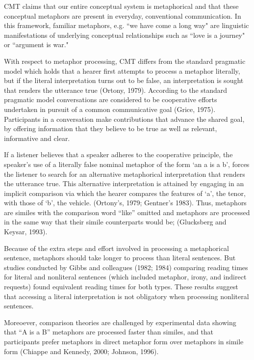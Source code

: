 \documentclass[]{article}
\begin{document}
	CMT claims that our entire conceptual system is metaphorical and that these conceptual metaphors are present in everyday, conventional communication. In this framework, familiar metaphors, e.g. ``we have come a long way" are linguistic manifestations of underlying conceptual relationships such as ``love is a journey" or ``argument is war." 
	
	With respect to metaphor processing, CMT differs from the standard pragmatic model  which holds that a hearer first attempts to process a metaphor literally, but if the literal interpretation turns out to be false, an interpretation is sought that renders the utterance true (Ortony, 1979). According to the standard pragmatic model conversations are considered to be cooperative efforts undertaken in pursuit of  a common communicative goal (Grice, 1975).  Participants in a conversation make contributions that advance the shared goal, by offering information that they believe to be true as well as relevant, informative and clear. 
	
	If a listener believes that a speaker adheres to the cooperative principle, the speaker's use of a literally false nominal metaphor of the form `an a is a b', forces the listener to search for an alternative metaphorical interpretation that renders the utterance true.  This alternative interpretation is attained by engaging in an implicit comparison via which the hearer compares the features of `a’, the tenor, with those of `b’, the vehicle. (Ortony’s, 1979; Gentner’s 1983). Thus, metaphors are similes with the comparison word “like” omitted and metaphors are processed in the same way that their simile counterparts would be;  (Glucksberg and Keysar, 1993).
	
	Because of the extra steps and effort involved in processing a metaphorical sentence, metaphors should take longer to process than literal sentences. But studies conducted by Gibbs and colleagues (1982; 1984) comparing reading times for literal and nonliteral sentences (which included metaphor, irony, and indirect requests) found equivalent reading times for both types. These results suggest that accessing a literal interpretation is not obligatory when processing nonliteral sentences. 
	
	Moreoever, comparison theories are challenged by experimental data showing that “A is a B” metaphors are processed faster than similes, and that participants prefer metaphors in direct metaphor form over metaphors in simile form (Chiappe and Kennedy, 2000; Johnson, 1996).
	
\end{document}
